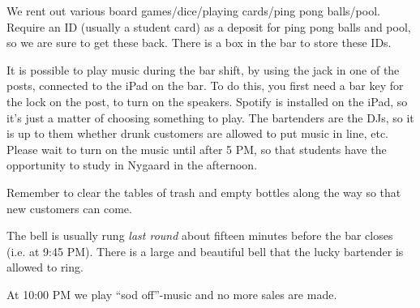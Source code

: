 We rent out various board games/dice/playing cards/ping pong balls/pool.
Require an ID (usually a student card) as a deposit for ping pong balls and pool,
so we are sure to get these back.
There is a box in the bar to store these IDs.

It is possible to play music during the bar shift, by using the
jack in one of the posts, connected to the iPad on the bar.
To do this, you first need a bar key
for the lock on the post, to turn on the speakers.
Spotify is installed on the iPad, so it's just a matter of choosing something to play.
The bartenders are the DJs, so it is up to them whether drunk customers are allowed to put music in line, etc.
Please wait to turn on the music until after 5 PM, so that students have the opportunity to study in Nygaard in the afternoon.

Remember to clear the tables of trash and empty bottles along the way so that new customers can come.

The bell is usually rung \textit{last round}
about fifteen minutes before the bar closes
(i.e. at 9:45 PM). There is a large and beautiful bell that the lucky bartender
is allowed to ring.

At 10:00 PM we play ``sod off''-music and no more sales are made.
